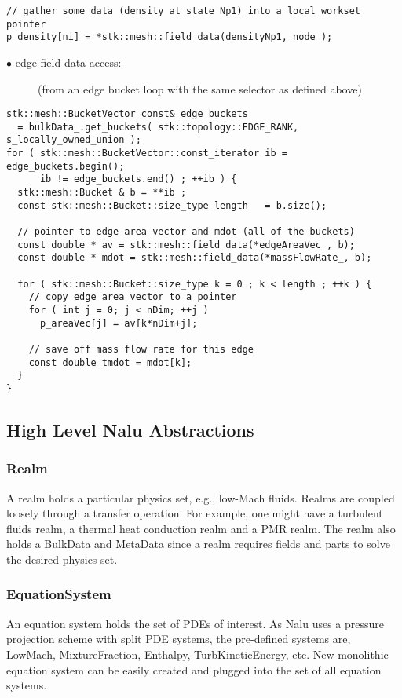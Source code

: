 \begin{lstlisting}
// gather some data (density at state Np1) into a local workset pointer
p_density[ni] = *stk::mesh::field_data(densityNp1, node );
\end{lstlisting}

\begin{description}
\item[$\bullet$ edge field data access:] (from an edge bucket loop with the same selector as defined above)
\end{description}

\begin{lstlisting}
stk::mesh::BucketVector const& edge_buckets 
  = bulkData_.get_buckets( stk::topology::EDGE_RANK, s_locally_owned_union );
for ( stk::mesh::BucketVector::const_iterator ib = edge_buckets.begin();
      ib != edge_buckets.end() ; ++ib ) {
  stk::mesh::Bucket & b = **ib ;
  const stk::mesh::Bucket::size_type length   = b.size();

  // pointer to edge area vector and mdot (all of the buckets)
  const double * av = stk::mesh::field_data(*edgeAreaVec_, b);
  const double * mdot = stk::mesh::field_data(*massFlowRate_, b);
  
  for ( stk::mesh::Bucket::size_type k = 0 ; k < length ; ++k ) {
    // copy edge area vector to a pointer
    for ( int j = 0; j < nDim; ++j )
      p_areaVec[j] = av[k*nDim+j];
     
    // save off mass flow rate for this edge
    const double tmdot = mdot[k];
  }
}
\end{lstlisting}

\subsection{High Level Nalu Abstractions}

\subsubsection{Realm}
A realm holds a particular physics set, e.g., low-Mach fluids. Realms are coupled
loosely through a transfer operation. For example, one might have a turbulent 
fluids realm, a thermal heat conduction realm and a PMR realm. The realm also 
holds a BulkData and MetaData since a realm requires fields and parts to solve
the desired physics set.

\subsubsection{EquationSystem}
An equation system holds the set of PDEs of interest. As Nalu uses a pressure projection
scheme with split PDE systems, the pre-defined systems are, LowMach, MixtureFraction,
Enthalpy, TurbKineticEnergy, etc. New monolithic equation system can be easily created and 
plugged into the set of all equation systems.

